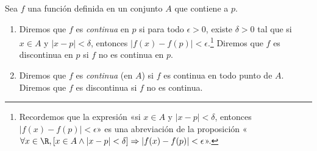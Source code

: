 \documentclass[12pt,a4paper]{book}
\begin{document}
    \begin{definicion}\label{def:40}
        Sea $f$ una
        función definida en un conjunto $A$ que contiene a $p$.
        \begin{enumerate}[nosep]
            \item Diremos que $f$ es \textit{continua} en $p$ si para todo $\epsilon>0$, existe $\delta>0$ tal que
            si $x\in A$ y $|x-p|<\delta$, entonces $|f(x)-f(p)|<\epsilon$.\footnote{Recordemos que la expresión «si $x\in A$ y $|x-p|<\delta$, entonces $|f(x)-f(p)|<\epsilon$» es
            una abreviación de la proposición «$\forall x\in\R,[x\in A\wedge|x-p|<\delta]\Rightarrow|f(x)-f(p)|<\epsilon$».} Diremos que $f$ es
            discontinua en $p$ si $f$ no es continua en $p$.
            \item Diremos que $f$ es \textit{continua} (en $A$) si $f$ es continua en todo punto de $A$.
            Diremos que $f$ es discontinua si $f$ no es continua.
        \end{enumerate}
    \end{definicion}
\end{document}
